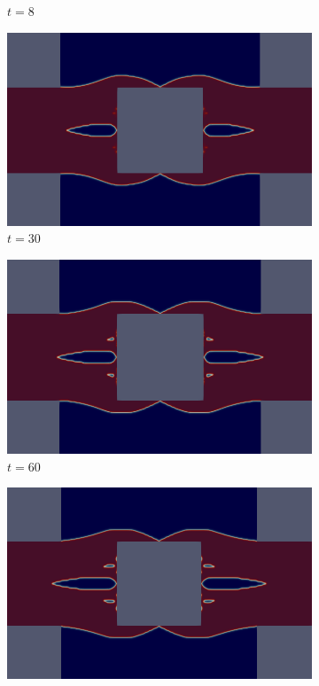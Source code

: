 \begin{figure}[H]
\begin{subfigure}{.4\textwidth}
        \caption{$t = 8$}
    \end{subfigure}
    \begin{subfigure}{.4\textwidth}
        \includegraphics[width=\textwidth]{imgs/HeatSink/fourth.png}
        \caption{$t = 30$}
    \end{subfigure}
    \begin{subfigure}{.4\textwidth}
        \includegraphics[width=\textwidth]{imgs/HeatSink/fifth.png}
        \caption{$t = 60$}
    \end{subfigure}
    \begin{subfigure}{.4\textwidth}
        \includegraphics[width=\textwidth]{imgs/HeatSink/sixth.png}

\end{subfigure}
\end{figure}
